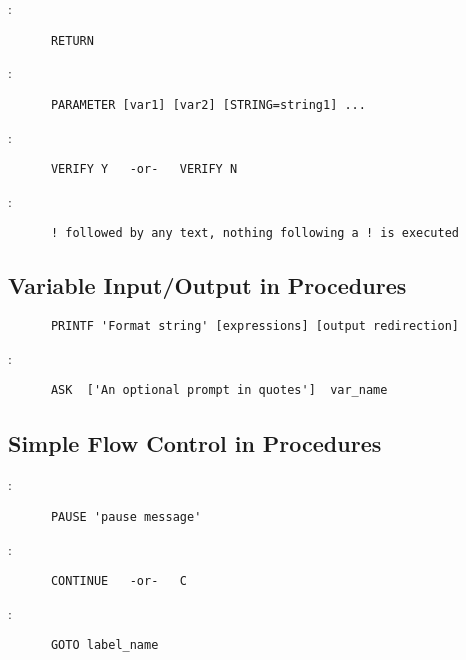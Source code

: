 \noindent {}:
\begin{verbatim}
      RETURN
\end{verbatim}

\noindent {}:
\begin{verbatim}
      PARAMETER [var1] [var2] [STRING=string1] ...
\end{verbatim}

\noindent {}:
\begin{verbatim}
      VERIFY Y   -or-   VERIFY N
\end{verbatim}

\noindent {}:
\begin{verbatim}
      ! followed by any text, nothing following a ! is executed
\end{verbatim}

\subsection{Variable Input/Output in Procedures}

\begin{verbatim}
      PRINTF 'Format string' [expressions] [output redirection]
\end{verbatim}

\noindent {}:
\begin{verbatim}
      ASK  ['An optional prompt in quotes']  var_name
\end{verbatim}

\subsection{Simple Flow Control in Procedures}

:
\begin{verbatim}
      PAUSE 'pause message'
\end{verbatim}

\noindent {}:
\begin{verbatim}
      CONTINUE   -or-   C
\end{verbatim}

\noindent {}:
\begin{verbatim}
      GOTO label_name
\end{verbatim}

